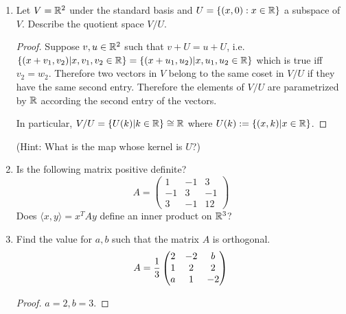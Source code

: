\documentclass{amsart}
\begin{document}
\begin{enumerate}
(Hint: give an example of two non-invertible maps that sums to an invertible map. You might try to use some theorems to do this in terms of matrices).

\begin{proof}\color{blue}
	Consider $A=\begin{pmatrix}
		1&0\\0&0
	\end{pmatrix}$ and $B=\begin{pmatrix}
		0&0\\0&1
	\end{pmatrix}$. Both $A,B$ are singular (non-invertible), but $A+B=I$ is invertible.
	
	So the set of non-invertible maps is not closed under addition.
\end{proof}

\item Let $V=\mathbb{R}^2$ under the standard basis and $U=\{(x,0):x\in\mathbb{R}\}$ a subspace of $V$. Describe the quotient space $V/U$. 

\begin{proof}\color{blue}
	Suppose $v,u\in\mathbb{R}^2$ such that $v+U=u+U$, i.e. $\{(x+v_1,v_2)|x,v_1,v_2\in\mathbb{R}\}=\{(x+u_1,u_2)|x,u_1,u_2\in\mathbb{R}\}$ which is true iff $v_2=w_2$. Therefore two vectors in $V$ belong to the same coset in $V/U$ if they have the same second entry. Therefore the elements of $V/U$ are parametrized by $\mathbb{R}$ according the  second entry of the vectors.
	
	In particular, $V/U=\{U(k)|k\in\mathbb{R} \}\cong \mathbb{R}$ where $U(k):=\{(x,k)|x\in \mathbb{R}\}$.
\end{proof}

(Hint: What is the map whose kernel is $U$?)
%
%
\item Is the following matrix positive definite?
\[A=\begin{pmatrix}
	1&-1&3\\-1&3&-1\\3&-1&12
\end{pmatrix}\]
Does $\langle x,y\rangle =x^TAy$ define an inner product on $\mathbb{R}^3$?
\item Find the value for $a,b$ such that the matrix $A$ is orthogonal.
\[A={1\over 3}\begin{pmatrix}2&-2&b\\1&2&2\\a&1&-2
\end{pmatrix}\]
\begin{proof}
	\color{blue} $a=2,b=3$.
\end{proof}
\end{enumerate}


%
%
\end{document}
